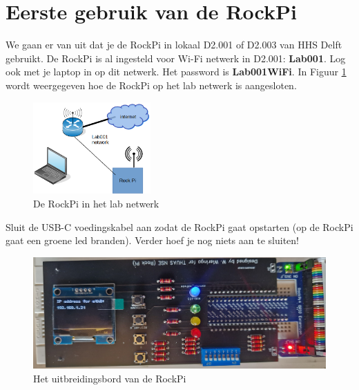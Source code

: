 \section{Eerste gebruik van de RockPi}
We gaan er van uit dat je de RockPi in lokaal D2.001 of D2.003 van HHS Delft gebruikt. \newline
De RockPi is al ingesteld voor Wi-Fi netwerk in D2.001: \textbf{Lab001}. \newline
Log ook met je laptop in op dit netwerk. Het password is \textbf{Lab001WiFi}. \newline
In Figuur \ref{fig:netw} wordt weergegeven hoe de RockPi op het lab netwerk is aangesloten.
\begin{figure}[h!]
	\centering
	\begin{center} 	
		\includegraphics[width=0.4\textwidth]{figuren/laBnetwork}
		\caption{De RockPi in het lab netwerk}
		\label{fig:netw}   
	\end{center}
\end{figure}
\break
Sluit de USB-C voedingskabel aan zodat de RockPi gaat opstarten (op de RockPi gaat een groene led branden). Verder hoef je nog niets aan te sluiten!
\begin{figure}[h!]
	\centering
	\begin{center} 	
		\includegraphics[width=1\textwidth]{figuren/rockIPnr}
		\caption{Het uitbreidingsbord van de RockPi}
		\label{fig:rockIPnr}   
	\end{center}
\end{figure}

